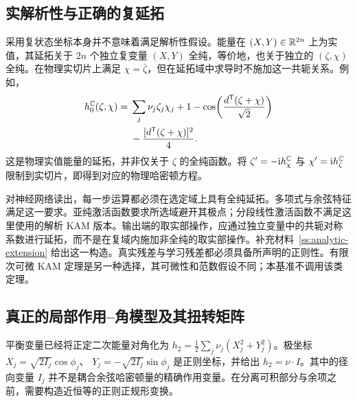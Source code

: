 \subsection{实解析性与正确的复延拓}
\label{kam:analyticity}

采用复状态坐标本身并不意味着满足解析性假设。能量在 $(X,Y)\in\mathbb R^{2n}$ 上为实值，其延拓关于 $2n$ 个独立复变量 $(X,Y)$ 全纯，等价地，也关于独立的 $(\zeta,\chi)$ 全纯。在物理实切片上满足 $\chi=\bar\zeta$，但在延拓域中求导时不施加这一共轭关系。例如，
\begin{equation}\label{kam:complex-energy}
\begin{aligned}
 h_0^{\mathbb C}(\zeta,\chi)
  ={}&\sum_j\nu_j\zeta_j\chi_j
      +1-\cos\!\left(\frac{d^{\mathsf T}(\zeta+\chi)}{\sqrt2}\right)\\
     &-\frac{[d^{\mathsf T}(\zeta+\chi)]^2}{4}.
\end{aligned}
\end{equation}
这是物理实值能量的延拓，并非仅关于 $\zeta$ 的全纯函数。将
$\zeta'=-\mathrm i h_\chi^{\mathbb C}$ 与
$\chi'=\mathrm i h_\zeta^{\mathbb C}$ 限制到实切片，即得到对应的物理哈密顿方程。

对神经网络读出，每一步运算都必须在选定域上具有全纯延拓。多项式与余弦特征满足这一要求。亚纯激活函数要求所选域避开其极点；分段线性激活函数不满足这里使用的解析 KAM 版本。输出端的取实部操作，应通过独立变量中的共轭对称系数进行延拓，而不是在复域内施加非全纯的取实部操作。补充材料~\ref{ss:analytic-extension} 给出这一构造。真实残差与学习残差都必须具备所声明的正则性。有限次可微 KAM 定理是另一种选择，其可微性和范数假设不同；本基准不调用该类定理。

\subsection{真正的局部作用--角模型及其扭转矩阵}
\label{kam:normalform-section}

平衡变量已经将正定二次能量对角化为 $h_2=\tfrac12\sum_j\nu_j(X_j^2+Y_j^2)$。极坐标
$X_j=\sqrt{2I_j}\cos\phi_j$、
$Y_j=-\sqrt{2I_j}\sin\phi_j$
是正则坐标，并给出 $h_2=\nu\cdot I$。其中的径向变量 $I_j$ 并不是耦合余弦哈密顿量的精确作用变量。在分离可积部分与余项之前，需要构造近恒等的正则正规形变换。

